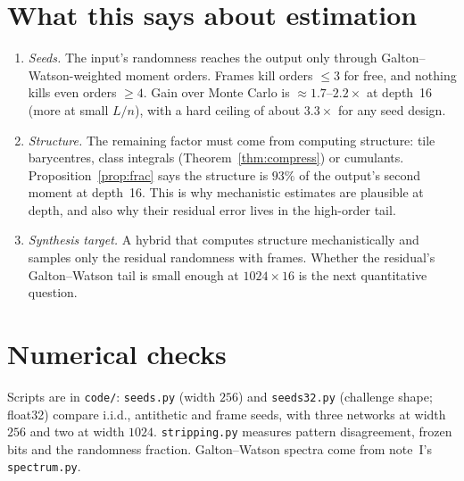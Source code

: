 \documentclass[11pt]{article}
\theoremstyle{definition}
\theoremstyle{remark}
\begin{document}
\section{What this says about estimation}
\begin{enumerate}
\item \emph{Seeds.} The input's randomness reaches the output only through Galton--Watson-weighted moment orders. Frames kill orders $\le3$ for free, and nothing kills even orders $\ge4$. Gain over Monte Carlo is $\approx1.7$--$2.2\times$ at depth~16 (more at small $L/n$), with a hard ceiling of about $3.3\times$ for any seed design.
\item \emph{Structure.} The remaining factor must come from computing structure: tile barycentres, class integrals (Theorem~\ref{thm:compress}) or cumulants. Proposition~\ref{prop:frac} says the structure is $93\%$ of the output's second moment at depth~16. This is why mechanistic estimates are plausible at depth, and also why their residual error lives in the high-order tail.
\item \emph{Synthesis target.} A hybrid that computes structure mechanistically and samples only the residual randomness with frames. Whether the residual's Galton--Watson tail is small enough at $1024\times16$ is the next quantitative question.
\end{enumerate}

\appendix
\section{Numerical checks}
Scripts are in \texttt{code/}: \texttt{seeds.py} (width $256$) and \texttt{seeds32.py} (challenge shape; float32) compare i.i.d., antithetic and frame seeds, with three networks at width $256$ and two at width $1024$. \texttt{stripping.py} measures pattern disagreement, frozen bits and the randomness fraction. Galton--Watson spectra come from note~I's \texttt{spectrum.py}.
\end{document}
